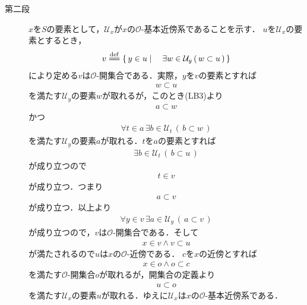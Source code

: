 \begin{prf}
\begin{description}
			\item[第二段]
				$x$を$S$の要素として，$\mathcal{U}_x$が$x$の$\mathscr{O}$-基本近傍系であることを示す．
				$u$を$\mathcal{U}_{x}$の要素とするとき，
				\begin{align}
					v \defeq \Set{y \in u}{\exists w \in \mathcal{U}_{y}\, (\, w \subset u\, )}
				\end{align}
				により定める$v$は$\mathscr{O}$-開集合である．実際，$y$を$v$の要素とすれば
				\begin{align}
					w \subset u
				\end{align}
				を満たす$\mathcal{U}_{y}$の要素$w$が取れるが，このとき(LB3)より
				\begin{align}
					a \subset w
				\end{align}
				かつ
				\begin{align}
					\forall t \in a\, \exists b \in \mathcal{U}_{t}\, (\, b \subset w\, )
				\end{align}
				を満たす$\mathcal{U}_{y}$の要素$a$が取れる．$t$を$a$の要素とすれば
				\begin{align}
					\exists b \in \mathcal{U}_{t}\, (\, b \subset u\, )
				\end{align}
				が成り立つので
				\begin{align}
					t \in v
				\end{align}
				が成り立つ．つまり
				\begin{align}
					a \subset v
				\end{align}
				が成り立つ．以上より
				\begin{align}
					\forall y \in v\, \exists a \in \mathcal{U}_{y}\, (\, a \subset v\, )
				\end{align}
				が成り立つので，$v$は$\mathscr{O}$-開集合である．そして
				\begin{align}
					x \in v \wedge v \subset u
				\end{align}
				が満たされるので$u$は$x$の$\mathscr{O}$-近傍である．
				$c$を$x$の近傍とすれば
				\begin{align}
					x \in o \wedge o \subset c
				\end{align}
				を満たす$\mathscr{O}$-開集合$o$が取れるが，開集合の定義より
				\begin{align}
					u \subset o
				\end{align}
				を満たす$\mathcal{U}_{x}$の要素$u$が取れる．ゆえに$\mathcal{U}_{x}$は$x$の$\mathscr{O}$-基本近傍系である．
				\QED
		\end{description}
	\end{prf}
